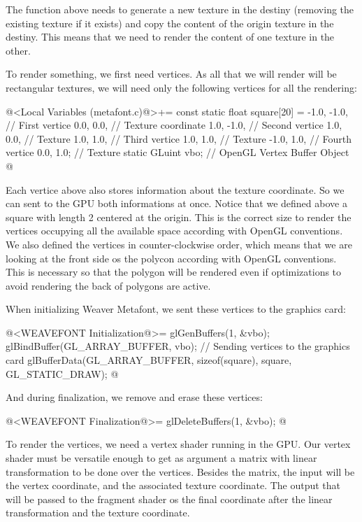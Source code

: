 {{{{{The function  above needs to
generate a new texture in the destiny (removing the existing texture
if it exists) and copy the content of the origin texture in the
destiny. This means that we need to render the content of one texture
in the other.

To render something, we first need vertices. As all that we will
render will be rectangular textures, we will need only the following
vertices for all the rendering:

\iniciocodigo
@<Local Variables (metafont.c)@>+=
const static float square[20] = {
  -1.0, -1.0, // First vertice
  0.0, 0.0,  // Texture coordinate
  1.0, -1.0, // Second vertice
  1.0, 0.0, // Texture
  1.0, 1.0, // Third vertice
  1.0, 1.0, // Texture
  -1.0, 1.0, // Fourth vertice
  0.0, 1.0}; // Texture
static GLuint vbo; // OpenGL Vertex Buffer Object
@
\fimcodigo

Each vertice above also stores information about the texture
coordinate. So we can sent to the GPU both informations at
once. Notice that we defined above a square with length 2 centered at
the origin. This is the correct size to render the vertices occupying
all the available space according with OpenGL conventions. We also
defined the vertices in counter-clockwise order, which means that we
are looking at the front side os the polycon according with OpenGL
conventions. This is necessary so that the polygon will be rendered
even if optimizations to avoid rendering the back of polygons are
active.

When initializing Weaver Metafont, we sent these vertices to the
graphics card:

\iniciocodigo
@<WEAVEFONT Initialization@>=
glGenBuffers(1, &vbo);
glBindBuffer(GL_ARRAY_BUFFER, vbo);
// Sending vertices to the graphics card
glBufferData(GL_ARRAY_BUFFER, sizeof(square), square, GL_STATIC_DRAW);
@
\fimcodigo

And during finalization, we remove and erase these vertices:

\iniciocodigo
@<WEAVEFONT Finalization@>=
glDeleteBuffers(1, &vbo);
@
\fimcodigo

To render the vertices, we need a vertex shader running in the
GPU. Our vertex shader must be versatile enough to get as argument a
matrix with linear transformation to be done over the
vertices. Besides the matrix, the input will be the vertex coordinate,
and the associated texture coordinate. The output that will be passed to
the fragment shader os the final coordinate after the linear
transformation and the texture coordinate.

}}}}}
